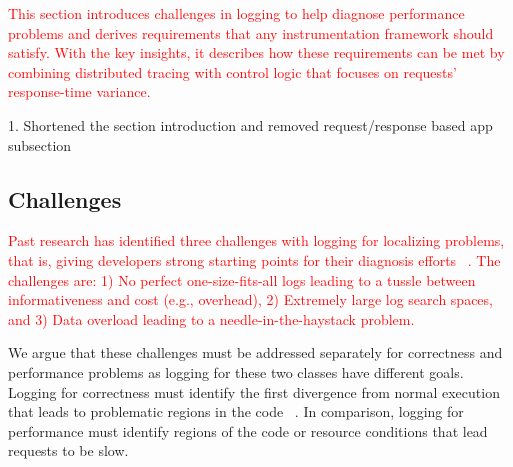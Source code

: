 \textcolor{red}{This section introduces challenges in logging to help diagnose performance problems
and derives requirements that any instrumentation framework should satisfy. 
With the key insights, it describes how these requirements can be met
by combining distributed tracing with control logic that focuses on requests' response-time variance.}

\begin{mycomment}
  1. Shortened the section introduction and removed request/response based app subsection
\end{mycomment}

\subsection{Challenges}
\textcolor{red}{
Past research has identified three challenges with logging for localizing problems, that is, giving developers strong starting points for their diagnosis efforts ~\cite{Kiciman2005a}. 
The challenges are: 
1) No perfect one-size-fits-all logs leading to a tussle between informativeness and cost (e.g., overhead), 
2) Extremely large log search spaces, and
3) Data overload leading to a needle-in-the-haystack problem.
}

We argue that these challenges must be addressed
separately for correctness and performance problems as logging for these two classes have different goals.
Logging for correctness must identify the first divergence from normal execution that
leads to problematic regions in the code ~\cite{ArumugaNainar:2010fx,
Yuan:2012eh, Yuan:2010ww, Zuo:2016et}. 
In comparison, logging for performance must identify regions of the code or resource conditions that lead requests to be slow.



